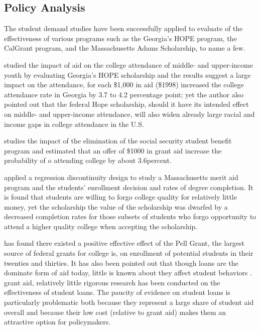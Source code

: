 \documentclass[12pt,english]{report}
\begin{document}
\subsection{Policy Analysis }
The student demand studies have been successfully applied to evaluate of the
effectiveness of various programs such as the Georgia's HOPE program, the
CalGrant program,  and the Massachusetts Adams Scholarship, to name a few.

\citet{Dynarski2000} studied the impact of aid on the college attendance of
middle- and upper-income youth by evaluating Georgia's HOPE scholarship and the
results suggest a large impact on the attendance, for each \$1,000 in aid
(\$1998) increased the college attendance rate in Georgia by 3.7  to 4.2
percentage point; yet the author also pointed out that the federal Hope
scholarship, should it have its intended effect on middle- and upper-income
attendance, will also widen already large racial and income gaps in college
attendance in the U.S.

\citet{Dynarski2003} studies the impact of the elimination of the social
security student benefit program and estimated that an offer of \$1000 in grant
aid increase the probability of o attending college by about 3.6percent.

\citet{Cohodes2014} applied a regression discontinuity design to study a
Massachusetts merit aid program and the students' enrollment decision and rates
of degree completion.  It is found that students are willing to forgo college
quality for relatively little money, yet the scholarship the value of the
scholarship was dwarfed by a decreased completion rates for those subsets of
students who  forgo opportunity to attend a higher quality college when
accepting the scholarship.

\citet{Turner2002} has found there existed a positive effective effect of the
Pell Grant, the largest source of federal grants for college is, on enrollment
of potential students in their twenties and thirties.  It has also been pointed
out that though loans are the dominate form of aid today, little is known about
they affect student behaviors \citep{Dynarski2013}.    %
grant aid, relatively little rigorous research has been conducted on the
effectiveness of student loans. The paucity of evidence on student loans is
particularly problematic both because they represent a large share of student
aid overall and because their low cost (relative to grant aid) makes them an
attractive option for policymakers.
\end{document}
